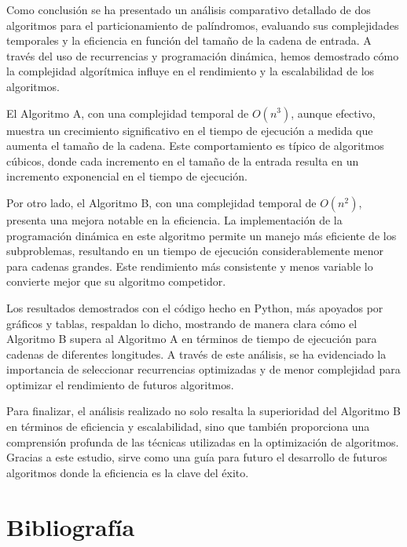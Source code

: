 \documentclass{report}
\begin{document}
Como conclusión se ha presentado un análisis comparativo detallado de dos algoritmos para el particionamiento de palíndromos, evaluando sus complejidades temporales y la eficiencia en función del tamaño de la cadena de entrada. A través del uso de recurrencias y programación dinámica, hemos demostrado cómo la complejidad algorítmica influye en el rendimiento y la escalabilidad de los algoritmos.

El Algoritmo A, con una complejidad temporal de $O(n^3)$, aunque efectivo, muestra un crecimiento significativo en el tiempo de ejecución a medida que aumenta el tamaño de la cadena. Este comportamiento es típico de algoritmos cúbicos, donde cada incremento en el tamaño de la entrada resulta en un incremento exponencial en el tiempo de ejecución.

Por otro lado, el Algoritmo B, con una complejidad temporal de $O(n^2)$, presenta una mejora notable en la eficiencia. La implementación de la programación dinámica en este algoritmo permite un manejo más eficiente de los subproblemas, resultando en un tiempo de ejecución considerablemente menor para cadenas grandes. Este rendimiento más consistente y menos variable lo convierte mejor que su algoritmo competidor.

Los resultados demostrados con el código hecho en Python, más apoyados por gráficos y tablas, respaldan lo dicho, mostrando de manera clara cómo el Algoritmo B supera al Algoritmo A en términos de tiempo de ejecución para cadenas de diferentes longitudes. A través de este análisis, se ha evidenciado la importancia de seleccionar recurrencias optimizadas y de menor complejidad para optimizar el rendimiento de futuros algoritmos.

Para finalizar, el análisis realizado no solo resalta la superioridad del Algoritmo B en términos de eficiencia y escalabilidad, sino que también proporciona una comprensión profunda de las técnicas utilizadas en la optimización de algoritmos. Gracias a este estudio, sirve como una guía para futuro el desarrollo de futuros algoritmos donde la eficiencia es la clave del éxito.


\section{Bibliografía}
\end{document}
